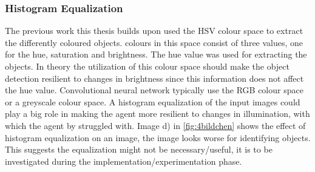 \subsubsection{Histogram Equalization}

The previous work this thesis builds upon used the HSV colour space to extract the differently coloured objects. colours in this space consist of three values, one for the hue, saturation and brightness. The hue value was used for extracting the objects. In theory the utilization of this colour space should make the object detection resilient to changes in brightness since this information does not affect the hue value.
Convolutional neural network typically use the RGB colour space or a greyscale colour space. A histogram equalization of the input images could play a big role in making the agent more resilient to changes in illumination, with which the agent by \autocite{maximilian} struggled with. Image d) in \ref{fig:4bildchen} shows the effect of histogram equalization on an image, the image looks worse for identifying objects. This suggests the equalization might not be necessary/useful, it is to be investigated during the implementation/experimentation phase.




